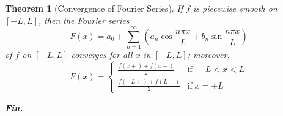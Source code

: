 \documentclass[12pt]{article}
\newtheorem{thm}{Theorem}[section]
\theoremstyle{definition}
\theoremstyle{remark}
\numberwithin{equation}{section}
\newcommand\B[1]{\textbf{ #1}}
\begin{document}
\vspace{1cm}

\begin{thm}[Convergence of Fourier Series]
        If $f$ is piecewise smooth on $[-L,L]$, then the Fourier series \begin{equation}
                F(x) = a_0 + \sum\limits_{n=1}^{\infty}\left(a_n\cos\frac{n\pi x}{L}+b_n\sin\frac{n\pi x}{L}\right)
        \end{equation}
        of $f$ on $[-L,L]$ converges for all $x$ in $[-L,L]$; moreover, \begin{equation}
                F(x) = \left\{\begin{array}{cc} \frac{f(x+)+f(x-)}{2} & \text{if}\;-L < x < L \\ \frac{f(-L+)+f(L-)}{2} & \text{if}\;x=\pm L \end{array}\right.
        \end{equation}
\end{thm}

\vspace{3cm}


\begin{center}
        \begin{Huge}
                \textit{\B{Fin.}}
        \end{Huge}
\end{center}





\end{document}
